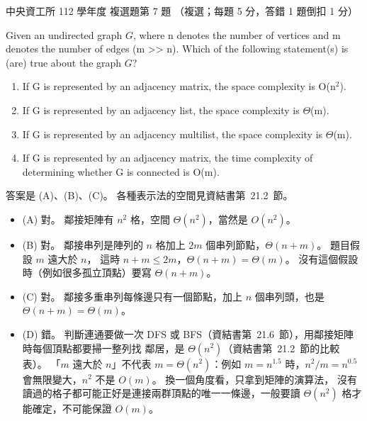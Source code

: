 \begin{pastexam}[label={px:ncu-112-dsa-07}]{中央資工所 112 學年度 複選題第 7 題}
（複選；每題 5 分，答錯 1 題倒扣 1 分）

Given an undirected graph $G$, where n denotes the number of vertices and m denotes the number of edges
(m >> n). Which of the following statement(s) is (are) true about the graph $G$?
\begin{enumerate}[label=(\Alph*)]
\item If G is represented by an adjacency matrix, the space complexity is O(n$^2$).
\item If G is represented by an adjacency list, the space complexity is $\Theta$(m).
\item If G is represented by an adjacency multilist, the space complexity is $\Theta$(m).
\item If G is represented by an adjacency matrix, the time complexity of determining whether G is
connected is O(m).
\end{enumerate}
\end{pastexam}

\begin{pastsoln}
答案是 (A)、(B)、(C)。 各種表示法的空間見資結書第~21.2~節。
\begin{itemize}
\item (A) 對。 鄰接矩陣有 $n^2$ 格，空間 $\Theta(n^2)$，當然是 $O(n^2)$。
\item (B) 對。 鄰接串列是陣列的 $n$ 格加上 $2m$ 個串列節點，$\Theta(n + m)$。 題目假設 $m$ 遠大於 $n$，
這時 $n + m \le 2m$，$\Theta(n + m) = \Theta(m)$。 沒有這個假設時（例如很多孤立頂點）要寫
$\Theta(n + m)$。
\item (C) 對。 鄰接多重串列每條邊只有一個節點，加上 $n$ 個串列頭，也是 $\Theta(n + m) = \Theta(m)$。
\item (D) 錯。 判斷連通要做一次 DFS 或 BFS（資結書第~21.6~節），用鄰接矩陣時每個頂點都要掃一整列找
鄰居，是 $\Theta(n^2)$（資結書第~21.2~節的比較表）。 「$m$ 遠大於 $n$」不代表 $m = \Theta(n^2)$：例如
$m = n^{1.5}$ 時，$n^2 / m = n^{0.5}$ 會無限變大，$n^2$ 不是 $O(m)$。 換一個角度看，只拿到矩陣的演算法，
沒有讀過的格子都可能正好是連接兩群頂點的唯一一條邊，一般要讀 $\Theta(n^2)$ 格才能確定，不可能保證
$O(m)$。
\end{itemize}
\end{pastsoln}
